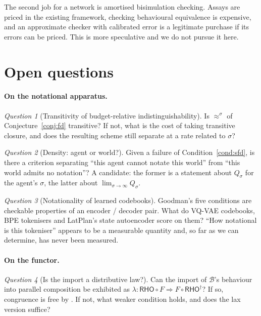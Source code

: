 \documentclass[11pt,a4paper]{article}
\theoremstyle{definition}
\theoremstyle{plain}
\theoremstyle{remark}
\newtheorem{question}{Question}
\newcommand{\RHO}{\mathsf{RHO}}
\newcommand{\Bee}{\mathcal{B}}
\newcommand{\bisim}{\approx}
\newcommand{\Qs}{Q_{\sigma}}
\begin{document}
The second job for a network is amortised bisimulation checking. Assays are priced in the
existing framework, checking behavioural equivalence is expensive, and an approximate
checker with calibrated error is a legitimate purchase if its errors can be priced. This
is more speculative and we do not pursue it here.

\section{Open questions}
\label{sec:open}

\paragraph{On the notational apparatus.}

\begin{question}[Transitivity of budget-relative indistinguishability]
\label{q:trans}
Is $\bisim^{\sigma}$ of Conjecture~\ref{conj:fd} transitive? If not, what is the cost of
taking transitive closure, and does the resulting scheme still separate at a rate related
to $\sigma$?
\end{question}

\begin{question}[Density: agent or world?]
\label{q:density}
Given a failure of Condition~\ref{cond:sfd}, is there a criterion separating ``this agent
cannot notate this world'' from ``this world admits no notation''? A candidate: the
former is a statement about $\Qs$ for the agent's $\sigma$, the latter about
$\lim_{\sigma \to \infty} \Qs$.
\end{question}

\begin{question}[Notationality of learned codebooks]
Goodman's five conditions are checkable properties of an encoder / decoder pair. What do
VQ-VAE codebooks, BPE tokenisers and LatPlan's state autoencoder score on them? ``How
notational is this tokeniser'' appears to be a measurable quantity and, so far as we can
determine, has never been measured.
\end{question}

\paragraph{On the functor.}

\begin{question}[Is the import a distributive law?]
\label{q:gsos}
Can the import of $\Bee$'s behaviour into parallel composition be exhibited as
$\lambda : \RHO \circ F \Rightarrow F \circ \RHO^{\dagger}$? If so, congruence is free by
\cite{turi1997}. If not, what weaker condition holds, and does the lax version suffice?
\end{question}
\end{document}
